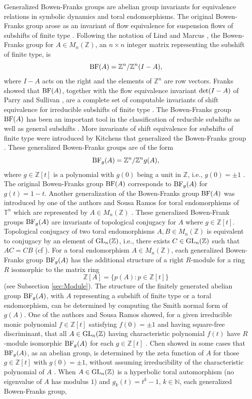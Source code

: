 \documentclass{amsart}
\theoremstyle{plain}
\theoremstyle{definition}
\theoremstyle{remark}
\begin{document}
Generalized Bowen-Franks groups are abelian group invariants for equivalence relations in symbolic dynamics and toral endomorphisms. The original Bowen-Franks group arose as an invariant of flow equivalence for suspension flows of subshifts of finite type \cite{BF77}. Following the notation of Lind and Marcus \cite{LM21}, the Bowen-Franks group for $A\in M_n({\mathbb Z})$, an $n\times n$ integer matrix representing the subshift of finite type, is
\[ {\rm BF}(A) = {\mathbb Z}^n/{\mathbb Z}^n(I-A),\]
where $I-A$ acts on the right and the elements of ${\mathbb Z}^n$ are row vectors. Franks showed that ${\rm BF}(A)$, together with the flow equivalence invariant ${\rm det}(I-A)$ of Parry and Sullivan \cite{PS75}, are a complete set of computable invariants of shift equivalence for irreducible subshifts of finite type \cite{Fr84}. The Bowen-Franks group ${\rm BF}(A)$ has been an important tool in the classification of reducible subshifts \cite{Hu95} as well as general subshifts \cite{Ma01,Ma21}. More invariants of shift equivalence for subshifts of finite type were introduced by Kitchens that generalized the Bowen-Franks group \cite{Ki98}. These generalized Bowen-Franks groups are of the form
\[ {\rm BF}_g(A) = {\mathbb Z}^n/{\mathbb Z}^n g(A),\]
where $g\in {\mathbb Z}[t]$ is a polynomial with $g(0)$ being a unit in ${\mathbb Z}$, i.e., $g(0) = \pm 1$ \cite{Ki98, LM21}. The original Bowen-Franks group ${\rm BF}(A)$ corresponds to ${\rm BF}_g(A)$ for $g(t) = 1-t$. Another generalization of the Bowen-Franks group ${\rm BF}(A)$ was introduced by one of the authors and Sousa Ramos for toral endomorphisms of ${\mathbb T}^n$ which are represented by $A\in M_n({\mathbb Z})$ \cite{MR05}. These generalized Bowen-Frank groups ${\rm BF}_g(A)$ are invariants of topological conjugacy for $A$ where $g\in {\mathbb Z}[t]$. Topological conjugacy of two toral endomorphisms $A,B\in M_n({\mathbb Z})$ is equivalent to conjugacy by an element of ${\rm GL}_n({\mathbb Z})$, i.e., there exists $C\in {\rm GL}_n({\mathbb Z})$ such that $AC = CB$  (cf \cite{AP65}). For a toral endomorphism $A \in M_n({\mathbb Z})$, each generalized Bowen-Franks group ${\rm BF}_g(A)$ has the additional structure of a right $R$-module for a ring $R$ isomorphic to the matrix ring
\[ {\mathbb Z}[A] = \{ p(A) : p\in {\mathbb Z}[t]\}\]
(see Subsection \ref{sec:Module}). The structure of the finitely generated abelian group ${\rm BF}_g(A)$, with $A$ representing a subshift of finite type or a toral endomorphism, can be determined by computing the Smith normal form of $g(A)$. One of the authors and Sousa Ramos showed, for a given irreducible monic polynomial $f\in {\mathbb Z}[t]$ satisfying $f(0) = \pm 1$ and having square-free discriminant, that all $A\in {\rm GL}_n({\mathbb Z})$ having characteristic polynomial $f(t)$ have $R$-module isomorphic ${\rm BF}_g(A)$ for each $g\in {\mathbb Z}[t]$  \cite{MR05}. Chen showed in some cases that ${\rm BF}_g(A)$, as an abelian group, is determined by the zeta function of $A$ for those $g\in{\mathbb Z}[t]$ with $g(0) = \pm 1$, without assuming irreducibility of the characteristic polynomial of $A$ \cite{Ch09}. When $A\in {\rm GL}_n({\mathbb Z})$ is a hyperbolic toral automorphism (no eigenvalue of $A$ has modulus $1$) and $g_k(t) = t^k-1$, $k\in {\mathbb N}$, each generalized Bowen-Franks group,
\end{document}
